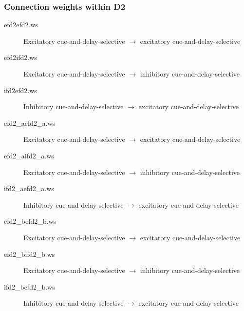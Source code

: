 \documentclass[12pt]{article}
\begin{document}
\subsubsection{Connection weights within D2}
\begin{description}
  \item[efd2efd2.ws] Excitatory cue-and-delay-selective $\rightarrow$
                     excitatory cue-and-delay-selective
  \item[efd2ifd2.ws] Excitatory cue-and-delay-selective $\rightarrow$
                     inhibitory cue-and-delay-selective
  \item[ifd2efd2.ws] Inhibitory cue-and-delay-selective $\rightarrow$
                     excitatory cue-and-delay-selective
  \item[efd2\_aefd2\_a.ws] Excitatory cue-and-delay-selective $\rightarrow$
                     excitatory cue-and-delay-selective
  \item[efd2\_aifd2\_a.ws] Excitatory cue-and-delay-selective $\rightarrow$
                     inhibitory cue-and-delay-selective
  \item[ifd2\_aefd2\_a.ws] Inhibitory cue-and-delay-selective $\rightarrow$
                     excitatory cue-and-delay-selective
  \item[efd2\_befd2\_b.ws] Excitatory cue-and-delay-selective $\rightarrow$
                     excitatory cue-and-delay-selective
  \item[efd2\_bifd2\_b.ws] Excitatory cue-and-delay-selective $\rightarrow$
                     inhibitory cue-and-delay-selective
  \item[ifd2\_befd2\_b.ws] Inhibitory cue-and-delay-selective $\rightarrow$
                     excitatory cue-and-delay-selective
\end{description}

\end{document}
